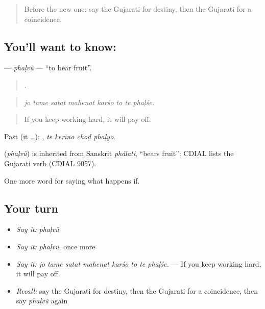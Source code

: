 \label{lesson:GU-C368-phalvu}



\begin{quote}
Before the new one: say the Gujarati for destiny, then the Gujarati for a coincidence.
\end{quote}

\subsection*{You'll want to know: }
\textbf{} — \emph{phaḷvũ} — \textquotedblleft{}to bear fruit\textquotedblright{}.

\begin{quote}
       .
\end{quote}

\begin{quote}
\emph{jo tame satat mahenat karśo to te phaḷśe.}
\end{quote}

\begin{quote}
If you keep working hard, it will pay off.
\end{quote}

Past (it …):    , \emph{te kerīno choḍ phaḷyo}.

\begin{cousinweb}
\textbf{} (\emph{phaḷvũ}) is inherited from Sanskrit \emph{phálati}, \textquotedblleft{}bears fruit\textquotedblright{}; CDIAL lists the Gujarati verb (CDIAL 9057).
\end{cousinweb}

\begin{grammarlens}[title={What you've built}]
One more word for saying what happens if.
\end{grammarlens}

\subsection*{Your turn}
\begin{itemize}
\raggedright
  \item \emph{Say it:} \emph{phaḷvũ}
  \item \emph{Say it:} \emph{phaḷvũ}, once more
  \item \emph{Say it:} \emph{jo tame satat mahenat karśo to te phaḷśe.} — If you keep working hard, it will pay off.
  \item \emph{Recall:} say the Gujarati for destiny, then the Gujarati for a coincidence, then say \emph{phaḷvũ} again
\end{itemize}

